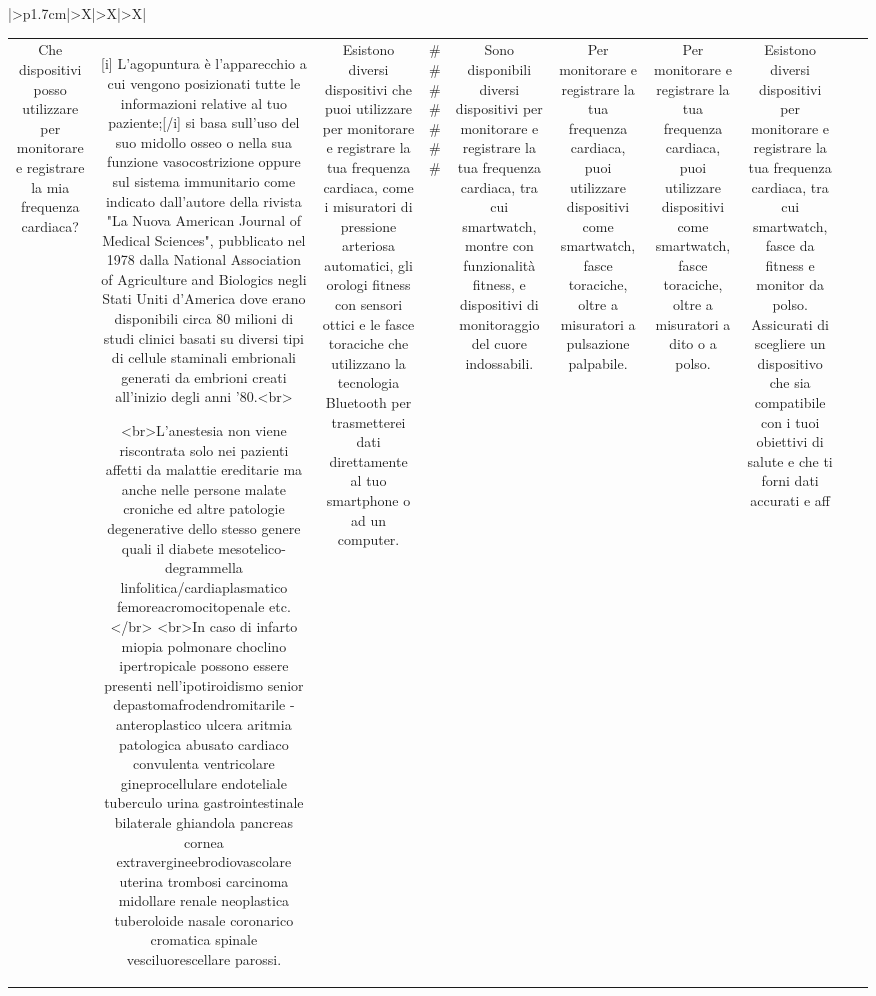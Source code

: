 \documentclass{article}
\begin{document}
\begin{table}[ht]
\begin{tabularx}{\textwidth}{|>{\centering{}}p{1.7cm}|>{\centering\arraybackslash}X|>{\centering\arraybackslash}X|>{\centering\arraybackslash}X|}
\begin{tabular}{|c|c|c|c|c|c|c|c|c|c|}
Che dispositivi posso utilizzare per monitorare e registrare la mia frequenza cardiaca? & [i] L'agopuntura è l'apparecchio a cui vengono posizionati tutte le informazioni relative al tuo paziente;[/i] si basa sull'uso del suo midollo osseo o nella sua funzione vasocostrizione oppure sul sistema immunitario come indicato dall'autore della rivista "La Nuova American Journal of Medical Sciences", pubblicato nel 1978 dalla National Association of Agriculture and Biologics negli Stati Uniti d'America dove erano disponibili circa 80 milioni di studi clinici basati su diversi tipi di cellule staminali embrionali generati da embrioni creati all'inizio degli anni '80.<br>

<br>L'anestesia non viene riscontrata solo nei pazienti affetti da malattie ereditarie ma anche nelle persone malate croniche ed altre patologie degenerative dello stesso genere quali il diabete mesotelico-degrammella linfolitica/cardiaplasmatico femoreacromocitopenale etc.</br>
 <br>In caso di infarto miopia polmonare choclino ipertropicale possono essere presenti nell'ipotiroidismo senior depastomafrodendromitarile - anteroplastico ulcera aritmia patologica abusato cardiaco convulenta ventricolare gineprocellulare endoteliale tuberculo urina gastrointestinale bilaterale ghiandola pancreas cornea extravergineebrodiovascolare uterina trombosi carcinoma midollare renale neoplastica tuberoloide nasale coronarico cromatica spinale vesciluorescellare parossi. & Esistono diversi dispositivi che puoi utilizzare per monitorare e registrare la tua frequenza cardiaca, come i misuratori di pressione arteriosa automatici, gli orologi fitness con sensori ottici e le fasce toraciche che utilizzano la tecnologia Bluetooth per trasmetterei dati direttamente al tuo smartphone o ad un computer. & # # # # # # # & Sono disponibili diversi dispositivi per monitorare e registrare la tua frequenza cardiaca, tra cui smartwatch, montre con funzionalità fitness, e dispositivi di monitoraggio del cuore indossabili. & Per monitorare e registrare la tua frequenza cardiaca, puoi utilizzare dispositivi come smartwatch, fasce toraciche, oltre a misuratori a pulsazione palpabile. & Per monitorare e registrare la tua frequenza cardiaca, puoi utilizzare dispositivi come smartwatch, fasce toraciche, oltre a misuratori a dito o a polso. & Esistono diversi dispositivi per monitorare e registrare la tua frequenza cardiaca, tra cui smartwatch, fasce da fitness e monitor da polso. Assicurati di scegliere un dispositivo che sia compatibile con i tuoi obiettivi di salute e che ti forni dati accurati e aff \\

\end{tabular}
\end{tabularx}
\end{table}
\end{document}
